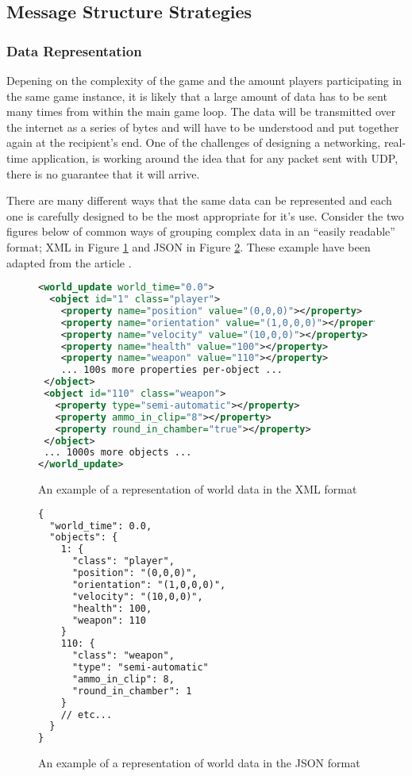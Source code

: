 \subsection{Message Structure Strategies}

\subsubsection{Data Representation}
Depening on the complexity of the game and the amount players participating in the same game instance, it is likely that a large amount of data has to be sent many times from within the main game loop. The data will be transmitted over the internet as a series of bytes and will have to be understood and put together again at the recipient's end. One of the challenges of designing a networking, real-time application, is working around the idea that for any packet sent with UDP, there is no guarantee that it will arrive.


There are many different ways that the same data can be represented and each one is carefully designed to be the most appropriate for it's use. Consider the two figures below of common ways of grouping complex data in an ``easily readable'' format; XML in Figure \ref{fig:xml-example} and JSON in Figure \ref{fig:json-example}. These example have been adapted from the article .

\newpage
\begin{figure}[!ht]
\begin{lstlisting}[language=xml]
<world_update world_time="0.0">
  <object id="1" class="player">
    <property name="position" value="(0,0,0)"></property>
    <property name="orientation" value="(1,0,0,0)"></property>
    <property name="velocity" value="(10,0,0)"></property>
    <property name="health" value="100"></property>
    <property name="weapon" value="110"></property>
    ... 100s more properties per-object ...
 </object>
 <object id="110" class="weapon">
   <property type="semi-automatic"></property>
   <property ammo_in_clip="8"></property>
   <property round_in_chamber="true"></property>
 </object>
 ... 1000s more objects ...
</world_update>
\end{lstlisting}

\caption{An example of a representation of world data in the XML format}
\label{fig:xml-example}
\end{figure}

\begin{figure}[!ht]
\begin{lstlisting}[language=xml]
{
  "world_time": 0.0,
  "objects": {
    1: {
      "class": "player",
      "position": "(0,0,0)",
      "orientation": "(1,0,0,0)",
      "velocity": "(10,0,0)",
      "health": 100,
      "weapon": 110
    }
    110: {
      "class": "weapon",
      "type": "semi-automatic"
      "ammo_in_clip": 8,
      "round_in_chamber": 1
    }
    // etc...
  }
}
\end{lstlisting}

\caption{An example of a representation of world data in the JSON format}
\label{fig:json-example}
\end{figure}

